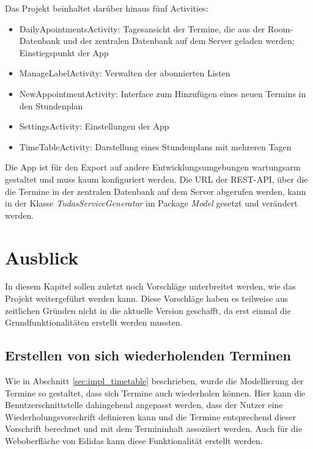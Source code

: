 \documentclass[noindent]{tudreport}
\begin{document}
			Das Projekt beinhaltet darüber hinaus fünf Activities:
			\begin{itemize}
			\item DailyApointmentsActivity: Tagesansicht der Termine, die aus der Room-Datenbank und der zentralen Datenbank auf dem Server geladen werden; Einstiegspunkt der App
			
			\item ManageLabelActivity: Verwalten der abonnierten Listen
			
			\item NewAppointmentActivity: Interface zum Hinzufügen eines neuen Termins in den Stundenplan
			
			\item SettingsActivity: Einstellungen der App
			
			\item TimeTableActivity: Darstellung eines Stundenplans mit mehreren Tagen
			\end{itemize}
			
			Die App ist für den Export auf andere Entwicklungsumgebungen wartungsarm gestaltet und muss kaum konfiguriert werden. Die URL der REST-API, über die die Termine in der zentralen Datenbank auf dem Server abgerufen werden, kann in der Klasse \textit{TudasServiceGenerator} im Package \textit{Model} gesetzt und verändert werden.
	
	\chapter{Ausblick}
		In diesem Kapitel sollen zuletzt noch Vorschläge unterbreitet werden, wie das Projekt weitergeführt werden kann. Diese Vorschläge haben es teilweise aus zeitlichen Gründen nicht in die aktuelle Version geschafft, da erst einmal die Grundfunktionalitäten erstellt werden mussten.
		
		\section{Erstellen von sich wiederholenden Terminen}
			Wie in Abschnitt \ref{sec:impl_timetable} beschrieben, wurde die Modellierung der Termine so gestaltet, dass sich Termine auch wiederholen können. Hier kann die Benutzerschnittstelle dahingehend angepasst werden, dass der Nutzer eine Wiederholungsvorschrift definieren kann und die Termine entsprechend dieser Vorschrift berechnet und mit dem Termininhalt assoziiert werden. Auch für die Weboberfläche von Edidas kann diese Funktionalität erstellt werden.
		
\end{document}
